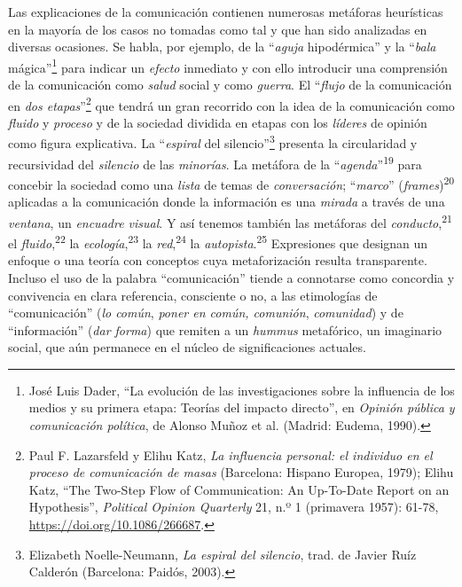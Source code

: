 \documentclass{tufte-handout}
\begin{document}
Las explicaciones de la comunicación contienen numerosas metáforas
heurísticas en la mayoría de los casos no tomadas como tal y que han
sido analizadas en diversas ocasiones. Se habla, por ejemplo, de la
``\emph{aguja} hipodérmica'' y la ``\emph{bala} mágica''\footnote{José
  Luis Dader, ``La evolución de las investigaciones sobre la influencia
  de los medios y su primera etapa: Teorías del impacto directo'', en
  \emph{Opinión pública y comunicación política}, de Alonso Muñoz et al.
  (Madrid: Eudema, 1990).} para indicar un \emph{efecto} inmediato y con
ello introducir una comprensión de la comunicación como \emph{salud}
social y como \emph{guerra}. El ``\emph{flujo} de la comunicación en
\emph{dos etapas}''\footnote{Paul F. Lazarsfeld y Elihu Katz, \emph{La
  influencia personal: el individuo en el proceso de comunicación de
  masas} (Barcelona: Hispano Europea, 1979); Elihu Katz, ``The Two-Step
  Flow of Communication: An Up-To-Date Report on an Hypothesis'',
  \emph{Political Opinion Quarterly} 21, n.º 1 (primavera 1957): 61-78,
  \url{https://doi.org/10.1086/266687}.} que tendrá un gran recorrido
con la idea de la comunicación como \emph{fluido} y \emph{proceso} y de
la sociedad dividida en etapas con los \emph{líderes} de opinión como
figura explicativa. La ``\emph{espiral} del silencio''\footnote{Elizabeth
  Noelle-Neumann, \emph{La espiral del silencio}, trad. de Javier Ruíz
  Calderón (Barcelona: Paidós, 2003).} presenta la circularidad y
recursividad del \emph{silencio} de las \emph{minorías}. La metáfora de
la ``\emph{agenda}''\textsuperscript{19} para concebir la sociedad
como una \emph{lista} de temas de \emph{conversación}; ``\emph{marco}''
(\emph{frames})\textsuperscript{20}
aplicadas a la comunicación donde la información es una \emph{mirada} a
través de una \emph{ventana}, un \emph{encuadre visual}. Y así tenemos
también las metáforas del \emph{conducto},\textsuperscript{21}
el \emph{fluido},\textsuperscript{22}
la \emph{ecología},\textsuperscript{23} la
\emph{red},\textsuperscript{24} la
\emph{autopista}.\textsuperscript{25} Expresiones que designan un enfoque o
una teoría con conceptos cuya metaforización resulta transparente.
Incluso el uso de la palabra ``comunicación'' tiende a connotarse como
concordia y convivencia en clara referencia, consciente o no, a las
etimologías de ``comunicación'' (\emph{lo común}, \emph{poner en común,
comunión}, \emph{comunidad}) y de ``información'' (\emph{dar forma}) que
remiten a un \emph{hummus} metafórico, un imaginario social, que aún
permanece en el núcleo de significaciones actuales.
\end{document}
